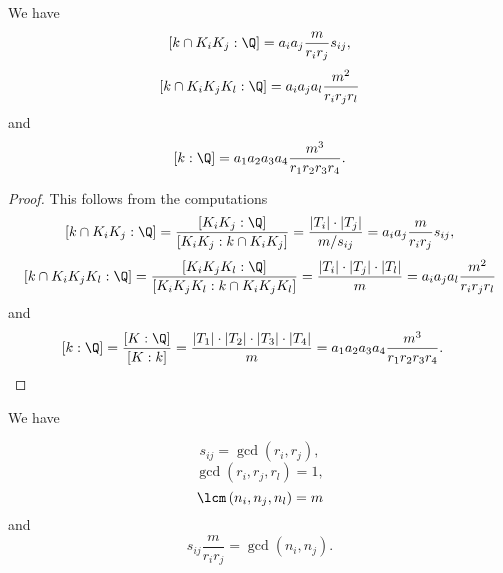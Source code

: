 \begin{cor}\label{compcap}
We have $$[k\cap K_iK_j:\Q]=a_ia_j\frac{m}{r_ir_j}s_{ij},$$ $$[k\cap K_iK_jK_l:\Q]=a_ia_ja_l\frac{m^2}{r_ir_jr_l}$$ and $$[k:\Q]=a_1a_2a_3a_4\frac{m^3}{r_1r_2r_3r_4}.$$
\end{cor}
\begin{proof}
This follows from the computations
$$[k\cap K_iK_j:\Q]=\frac{[K_iK_j:\Q]}{[K_iK_j:k\cap K_iK_j]}=\frac{|T_i|\cdot|T_j|}{m/s_{ij}}=a_ia_j\frac{m}{r_ir_j}s_{ij},$$
$$[k\cap K_iK_jK_l:\Q]=\frac{[K_iK_jK_l:\Q]}{[K_iK_jK_l:k\cap K_iK_jK_l]}=\frac{|T_i|\cdot|T_j|\cdot|T_l|}{m}=a_ia_ja_l\frac{m^2}{r_ir_jr_l}$$
and
\begin{equation*}
\begin{split}
[k:\Q]&=\frac{[K:\Q]}{[K:k]}=\frac{|T_1|\cdot|T_2|\cdot|T_3|\cdot|T_4|}{m}=
a_1a_2a_3a_4\frac{m^3}{r_1r_2r_3r_4}.
\end{split}
\end{equation*}

\end{proof}
\begin{lemma}\label{coprime}
We have 

$$s_{ij}=\gcd(r_i,r_j),$$ $$\gcd(r_i,r_j,r_l)=1,$$ $$\lcm\left(n_i,n_j,n_l\right)=m$$ and $$s_{ij}\frac{m}{r_ir_j}=\gcd(n_i,n_j).$$
\end{lemma}
